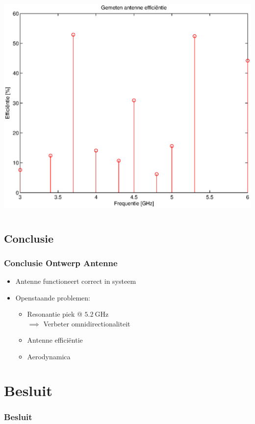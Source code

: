 \documentclass{beamer}
\begin{document}
\begin{frame}
\begin{columns}
\begin{column}{0.5\textwidth}
      \includegraphics[width=\textwidth]{images/ant_eff}
    \end{column}
    \end{columns}
  \end{frame}

\subsection{Conclusie}
  \begin{frame}
  \frametitle{Conclusie Ontwerp Antenne}
    \begin{itemize}
      \item Antenne functioneert correct in systeem
      \item Openstaande problemen:
      \begin{itemize}
        \item Resonantie piek @ $\SI{5.2}{\giga\hertz}$ \\ $\implies$ Verbeter omnidirectionaliteit
        \item Antenne effici\"entie
        \item Aerodynamica
      \end{itemize}
    \end{itemize}

  \end{frame}

\section{Besluit}
  \begin{frame}
  \frametitle{Besluit}
    

  \end{frame}
\end{document}
